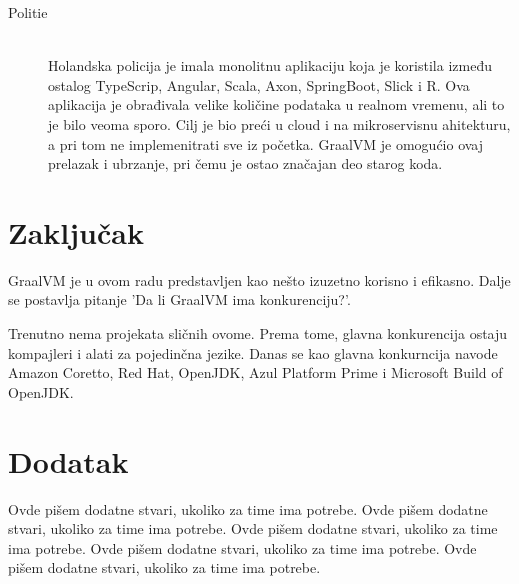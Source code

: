 \documentclass[a4paper]{article}
\begin{document}
\begin{description}
	\item[Politie]  \hfil \\
	Holandska policija je imala monolitnu aplikaciju koja je koristila između ostalog TypeScrip, Angular, Scala, Axon, SpringBoot, Slick i R. Ova aplikacija je obrađivala velike količine podataka u realnom vremenu, ali to je bilo veoma sporo. Cilj je bio preći u cloud i na mikroservisnu ahitekturu, a pri tom ne implemenitrati sve iz početka. GraalVM je omogućio ovaj prelazak i ubrzanje, pri čemu je ostao značajan deo starog koda.
	
\end{description}


\section{Zaključak}
\label{sec:zakljucak}
GraalVM je u ovom radu predstavljen kao nešto izuzetno korisno i efikasno. Dalje se postavlja pitanje 'Da li GraalVM ima konkurenciju?'.

Trenutno nema projekata sličnih ovome. Prema tome, glavna konkurencija ostaju kompajleri i alati za pojedinčna jezike. Danas se kao glavna konkurncija navode Amazon Coretto, Red Hat, OpenJDK, Azul Platform Prime i Microsoft Build of OpenJDK. 

\appendix
 


\appendix
\section{Dodatak}
Ovde pišem dodatne stvari, ukoliko za time ima potrebe.
Ovde pišem dodatne stvari, ukoliko za time ima potrebe.
Ovde pišem dodatne stvari, ukoliko za time ima potrebe.
Ovde pišem dodatne stvari, ukoliko za time ima potrebe.
Ovde pišem dodatne stvari, ukoliko za time ima potrebe.
\end{document}
